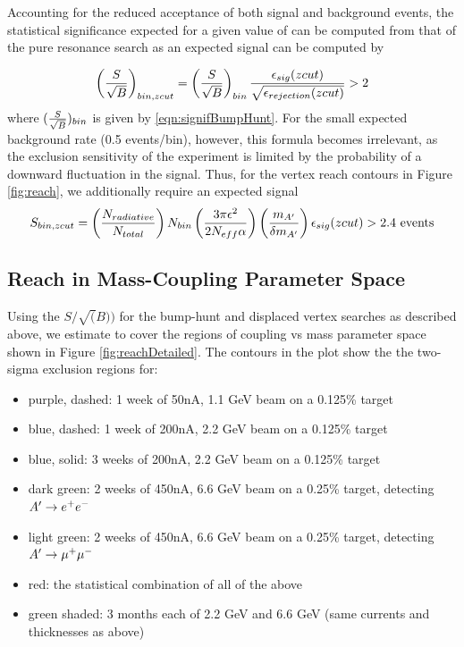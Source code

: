 Accounting for the reduced acceptance of both signal and background events, the statistical 
significance expected for a given value of can be computed from that of the pure resonance 
search as  an expected signal can be computed by

\begin{equation}
 \left({{S} \over {\sqrt{B}}}\right)_{bin,zcut}=\left ({{S} \over {\sqrt{B}}}\right)_{bin}  
{{\epsilon_{sig} (zcut)} \over {\sqrt{\epsilon_{rejection} (zcut)}}} >2
\label{eqn:signifVertex}
\end{equation}
where $({{S} \over {\sqrt{B}}})_{bin}$ is given by \eqref{eqn:signifBumpHunt}. For the small expected background rate 
(0.5 events/bin), however, this formula becomes irrelevant, as the exclusion sensitivity of 
the experiment is limited by the probability of a downward fluctuation in the signal.  
Thus, for the vertex reach contours in Figure \ref{fig:reach}, we additionally require 
an expected signal
\begin{equation}
 S_{bin,zcut}=\left({{N_{radiative} \over {N_{total}}}}\right) N_{bin} 
\left({{3\pi \epsilon^2} \over {2 N_{eff}\alpha}}\right) \left({{m_{A'}} \over {\delta m_{A'}}}\right) \epsilon_{sig}
 (zcut) > 2.4~ {\rm events} 
 \label{eqn:signalVertex}
\end{equation}

\subsection{Reach in Mass-Coupling Parameter Space}

Using the $S/\sqrt(B))$ for the bump-hunt  and displaced vertex searches as described above, we estimate to cover the regions of coupling vs mass parameter space shown in Figure \ref{fig:reachDetailed}.  The contours in the plot show the the two-sigma exclusion regions for:
\begin{itemize}
\item purple, dashed: 1 week of 50nA, 1.1 GeV beam on a 0.125\% target
\item blue, dashed: 1 week of 200nA, 2.2 GeV beam on a 0.125\% target
\item blue, solid: 3 weeks of 200nA, 2.2 GeV beam on a 0.125\% target
\item dark green: 2 weeks of 450nA, 6.6 GeV beam on a 0.25\% target, detecting $A^\prime\rightarrow e^+e^-$
\item light green: 2 weeks of 450nA, 6.6 GeV beam on a 0.25\% target, detecting $A^\prime\rightarrow \mu^+\mu^-$
\item red:  the statistical combination of all of the above
\item green shaded:  3 months each of 2.2 GeV and 6.6 GeV (same currents and thicknesses as above)
\end{itemize}



